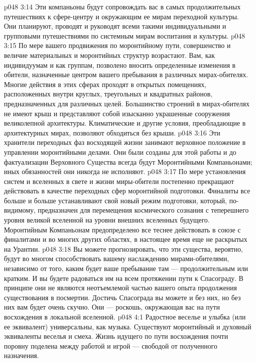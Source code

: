 \vs p048 3:14 \pc {}\bibnobreakspace {} Эти компаньоны будут сопровождать вас в самых продолжительных путешествиях к сфере\hyp{}центру и окружающим ее мирам переходной культуры. Они планируют, проводят и руководят всеми такими индивидуальными и групповыми путешествиями по системным мирам воспитания и культуры.
\vs p048 3:15 \pc {}\bibnobreakspace {} По мере вашего продвижения по моронтийному пути, совершенство и величие материальных и моронтийных структур возрастают. Вам, как индивидуумам и как группам, позволено вносить определенные изменения в обители, назначенные центром вашего пребывания в различных мирах\hyp{}обителях. Многие действия в этих сферах проходят в открытых помещениях, расположенных внутри круглых, треугольных и квадратных районов, предназначенных для различных целей. Большинство строений в мирах\hyp{}обителях не имеют крыш и представляют собой изысканно украшенные сооружения великолепной архитектуры. Климатические и другие условия, преобладающие в архитектурных мирах, позволяют обходиться без крыши.
\vs p048 3:16 \pc Эти хранители переходных фаз восходящей жизни занимают верховное положение в управлении моронтийными делами. Они были созданы для этой работы и до фактуализации Верховного Существа всегда будут Моронтийными Компаньонами; иных обязанностей они никогда не исполняют.
\vs p048 3:17 По мере установления систем и вселенных в свете и жизни миры\hyp{}обители постепенно прекращают действовать в качестве переходных сфер моронтийной подготовки. Финалиты все больше и больше устанавливают свой новый режим подготовки, который, по\hyp{}видимому, предназначен для перемещения космического сознания с теперешнего уровня великой вселенной на уровни внешних вселенных будущего. Моронтийным Компаньонам предопределено все теснее действовать в союзе с финалитами и во многих других областях, в настоящее время еще не раскрытых на Урантии.
\vs p048 3:18 Вы можете прогнозировать, что эти существа, вероятно, будут во многом способствовать вашему наслаждению мирами\hyp{}обителями, независимо от того, каким будет ваше пребывание там --- продолжительным или кратким. И вы будете радоваться им на всем протяжении пути к Спасограду. В принципе они не являются неотъемлемой частью вашего опыта продолжения существования в посмертии. Достичь Спасограда вы можете и без них, но без них вам будет очень скучно. Они --- роскошь, окружающая вас на пути восхождения в локальной вселенной.
\vs p048 4:1 Радостное веселье и улыбка (или ее эквивалент) универсальны, как музыка. Существуют моронтийный и духовный эквиваленты веселья и смеха. Жизнь идущего по пути восхождения почти поровну поделена между работой и игрой --- свободой от полученного назначения.
